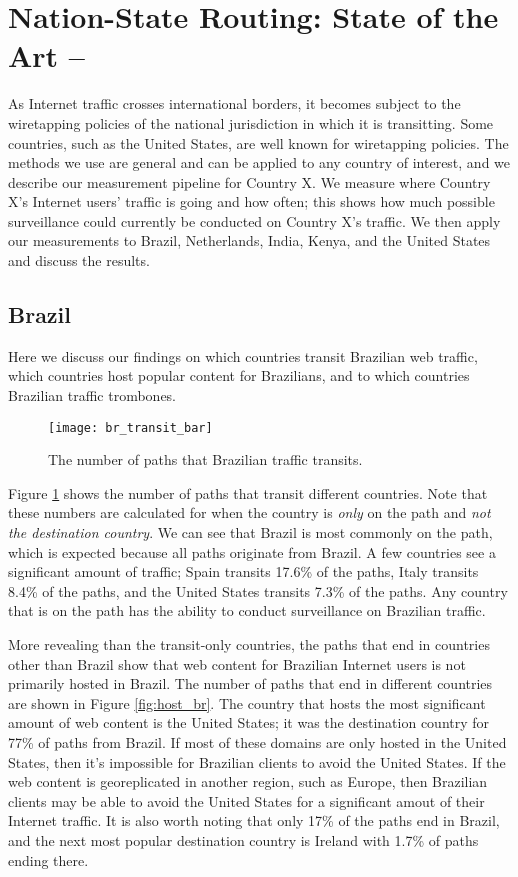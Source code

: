 \section{Nation-State Routing: State of the Art -- }
\label{measure}

As Internet traffic crosses international borders, it becomes subject to the wiretapping policies of the national jurisdiction in which it is transitting.  Some countries, such as the United States, are well known for wiretapping policies.  The methods we use are general and can be applied to any country of interest, and we describe our measurement pipeline for Country X. We measure where Country X's Internet users' traffic is going and how often; this shows how much possible surveillance could currently be conducted on Country X's traffic.  We then apply our measurements to Brazil, Netherlands, India, Kenya, and the United States and discuss the results.

\subsection{Brazil}
Here we discuss our findings on which countries transit Brazilian web traffic, which countries host popular content for Brazilians, and to which countries Brazilian traffic trombones.  

\begin{figure}
\centering
\texttt{[image: br\_transit\_bar]}
\caption{The number of paths that Brazilian traffic transits.}
\label{fig:transit_br}
\end{figure}

Figure \ref{fig:transit_br} shows the number of paths that transit different countries.  Note that these numbers are calculated for when the country is \textit{only} on the path and \textit{not the destination country}.  We can see that Brazil is most commonly on the path, which is expected because all paths originate from Brazil.  A few countries see a significant amount of traffic; Spain transits 17.6\% of the paths, Italy transits 8.4\% of the paths, and the United States transits 7.3\% of the paths.  Any country that is on the path has the ability to conduct surveillance on Brazilian traffic.  

More revealing than the transit-only countries, the paths that end in countries other than Brazil show that web content for Brazilian Internet users is not primarily hosted in Brazil.  The number of paths that end in different countries are shown in Figure \ref{fig:host_br}.  The country that hosts the most significant amount of web content is the United States; it was the destination country for 77\% of paths from Brazil.  If most of these domains are only hosted in the United States, then it's impossible for Brazilian clients to avoid the United States.  If the web content is georeplicated in another region, such as Europe, then Brazilian clients may be able to avoid the United States for a significant amout of their Internet traffic.  It is also worth noting that only 17\% of the paths end in Brazil, and the next most popular destination country is Ireland with 1.7\% of paths ending there.  

